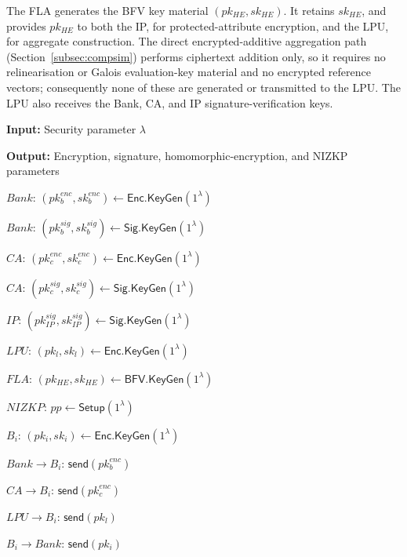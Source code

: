 \documentclass[a4paper,fleqn]{cas-dc}
\begin{document}
The FLA generates the BFV key material
$(pk_{HE},sk_{HE})$. It retains $sk_{HE}$, and provides $pk_{HE}$ to both the
IP, for protected-attribute encryption, and the LPU, for aggregate
construction. The direct encrypted-additive aggregation path (Section~\ref{subsec:compsim}) performs ciphertext addition only, so it requires no
relinearisation or Galois evaluation-key material and no encrypted reference
vectors; consequently none of these are generated or transmitted to the LPU.
The LPU also receives the Bank, CA, and IP signature-verification keys.



\begin{algorithm}[t]
\caption{Initialisation}
\label{alg:init}
\small

\textbf{Input:}
Security parameter $\lambda$

\textbf{Output:}
Encryption, signature, homomorphic-encryption, and NIZKP parameters

\begin{algorithmic}[1]

\State $Bank$:
$(pk_b^{enc},sk_b^{enc})
\leftarrow
\mathsf{Enc.KeyGen}(1^\lambda)$

\State $Bank$:
$(pk_b^{sig},sk_b^{sig})
\leftarrow
\mathsf{Sig.KeyGen}(1^\lambda)$

\State $CA$:
$(pk_c^{enc},sk_c^{enc})
\leftarrow
\mathsf{Enc.KeyGen}(1^\lambda)$

\State $CA$:
$(pk_c^{sig},sk_c^{sig})
\leftarrow
\mathsf{Sig.KeyGen}(1^\lambda)$

\State $IP$:
$(pk_{IP}^{sig},sk_{IP}^{sig})
\leftarrow
\mathsf{Sig.KeyGen}(1^\lambda)$

\State $LPU$:
$(pk_l,sk_l)
\leftarrow
\mathsf{Enc.KeyGen}(1^\lambda)$

\State $FLA$:
$(pk_{HE},sk_{HE})
\leftarrow
\mathsf{BFV.KeyGen}(1^\lambda)$

\State $NIZKP$:
$pp
\leftarrow
\mathsf{Setup}(1^\lambda)$


    \State $B_i$:
    $(pk_i,sk_i)
    \leftarrow
    \mathsf{Enc.KeyGen}(1^\lambda)$

    \State $Bank\rightarrow B_i$:
    $\mathsf{send}(pk_b^{enc})$

    \State $CA\rightarrow B_i$:
    $\mathsf{send}(pk_c^{enc})$

    \State $LPU\rightarrow B_i$:
    $\mathsf{send}(pk_l)$

    \State $B_i\rightarrow Bank$:
    $\mathsf{send}(pk_i)$


\end{algorithmic}
\end{algorithm}
\end{document}

